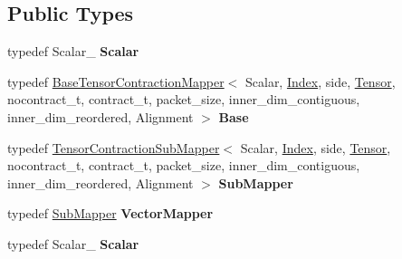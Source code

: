 \subsection*{Public Types}
\begin{DoxyCompactItemize}
\item 
\mbox{\label{class_eigen_1_1internal_1_1_tensor_contraction_input_mapper_a707f03d2dce3f92da78a3b84e89abe8b}} 
typedef Scalar\+\_\+ {\bfseries Scalar}
\item 
\mbox{\label{class_eigen_1_1internal_1_1_tensor_contraction_input_mapper_addcf426507713e9384f419b9588c14b9}} 
typedef \hyperlink{class_eigen_1_1internal_1_1_base_tensor_contraction_mapper}{Base\+Tensor\+Contraction\+Mapper}$<$ Scalar, \hyperlink{namespace_eigen_a62e77e0933482dafde8fe197d9a2cfde}{Index}, side, \hyperlink{class_eigen_1_1_tensor}{Tensor}, nocontract\+\_\+t, contract\+\_\+t, packet\+\_\+size, inner\+\_\+dim\+\_\+contiguous, inner\+\_\+dim\+\_\+reordered, Alignment $>$ {\bfseries Base}
\item 
\mbox{\label{class_eigen_1_1internal_1_1_tensor_contraction_input_mapper_adfec7e1f296094d138006708d8232809}} 
typedef \hyperlink{class_eigen_1_1internal_1_1_tensor_contraction_sub_mapper}{Tensor\+Contraction\+Sub\+Mapper}$<$ Scalar, \hyperlink{namespace_eigen_a62e77e0933482dafde8fe197d9a2cfde}{Index}, side, \hyperlink{class_eigen_1_1_tensor}{Tensor}, nocontract\+\_\+t, contract\+\_\+t, packet\+\_\+size, inner\+\_\+dim\+\_\+contiguous, inner\+\_\+dim\+\_\+reordered, Alignment $>$ {\bfseries Sub\+Mapper}
\item 
\mbox{\label{class_eigen_1_1internal_1_1_tensor_contraction_input_mapper_ad20ef8ff1adb79768f55bce3003f0902}} 
typedef \hyperlink{class_eigen_1_1internal_1_1_tensor_contraction_sub_mapper}{Sub\+Mapper} {\bfseries Vector\+Mapper}
\item 
\mbox{\label{class_eigen_1_1internal_1_1_tensor_contraction_input_mapper_a707f03d2dce3f92da78a3b84e89abe8b}} 
typedef Scalar\+\_\+ {\bfseries Scalar}
\item 

\end{DoxyCompactItemize}
